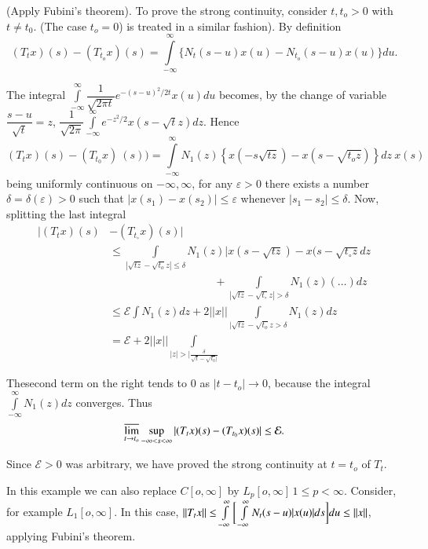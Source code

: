 \begin{enumerate}[I]
 (Apply Fubini's theorem). To prove the strong continuity, consider
 $t, t_o > 0$ with $t \neq t_0$. (The case $t_o = 0$) is treated in a
 similar fashion). By definition 
 $$
 (T_t x )(s) - (T_{ t_o }x)(s) = \int\limits^{\infty}_{
  -\infty}\bigg\{ N_t (s-u) x(u) - N_{t_o}(s-u) x(u) \bigg\} du. 
 $$
 
 The integral $\int\limits^{ \infty}_{-\infty} \dfrac{1}{\sqrt{2
   \pi t}} e^ {-(s - u)^2 /2t} x(u) du$ becomes, by the change of
 variable $\dfrac{s-u}{\sqrt{t}} = z$, $\dfrac{1}{\sqrt{2 \pi}}
 \int\limits^{\infty}_{ - \infty} e^{- z^2 / 2} x ( s - \sqrt{t}z) dz$. Hence 
 $$
 (T_t x)(s) - (T_{t_0} x) ~
 (s)) = \int\limits_{-\infty}^{\infty} N_1 (z)\left\{ x\left(-s
 \sqrt{tz}\right)- x (s - \sqrt{t_o z} )\right\} dz~ x(s)
 $$ 
 being uniformly continuous
 on $-\infty,\infty$, for any $\varepsilon > 0$ there exists a
 number $\delta = \delta (\varepsilon) > 0$ such that $| x(s_1) -
 x(s_2) | \leq \varepsilon $ whenever $|s_1 - s_2|\leq \delta$. Now,
 splitting the last integral 
 \begin{align*}
  | (T_t x ) (s) & - (T_{t_\circ} x )(s)| \\
  & \leq \int\limits_{|\sqrt{tz}- \sqrt{t_o} z| \leq \delta} N_1
  (z) | x (s - \sqrt{tz}) - x (s - \sqrt{t_\circ z}dz\\ 
  & \hspace{4cm} +
  \int\limits_{|\sqrt{tz} - \sqrt{t_\circ}z |> \delta} N_1 (z)(\ldots)
  dz\\ 
  & \leq \mathcal{E} \int N_1 (z) dz + 2 ||x|| \int\limits_{ |
   \sqrt{tz} - \sqrt{t_o}z> \delta} N_1 (z) dz\\ 
  & = \mathcal{E} + 2 || x|| \int\limits_{|z| > |
   \frac{\delta}{\sqrt{t}-{\sqrt{t_0}}|}} 
 \end{align*}
 
 The\pageoriginale second term on the right tends to $0$ as $|t -t_o| \to 0$,
 because the integral $\int\limits_{ -\infty}^{ \infty} N_1 (z) dz$
 converges. Thus 
 $$
 \varlimsup_{ t \to t_o} \sup_{ -\infty < s < \infty}| (T_t x)(s) -
 (T_{t_0} x)(s)| \leq \mathcal{E}. 
 $$

 Since $\mathcal{E} > 0$ was arbitrary, we have proved the strong
 continuity at $ t =t_o$ of $T_t$. 
 
 In this example we can also replace $C[ o, \infty]$ by $L_p[ o,
  \infty]\, 1 \leq p < \infty$. Consider, for example $L_1[ o,
  \infty]$. In this case, $||T_t x|| \leq \int\limits^{\infty}_{ -
  \infty} \bigg[ \int\limits^{\infty}_{-\infty} N_t\break (s-u) |x(u)|
  ds\bigg] du \leq || x ||$, applying Fubini's theorem. 
 

\end{enumerate}
